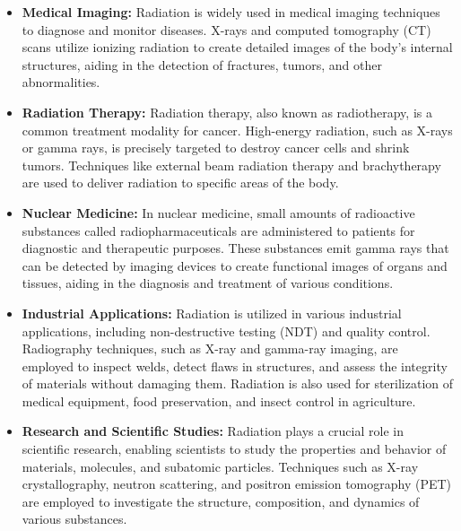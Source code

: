 \documentclass[../../Report.tex]{subfiles}
\begin{document}
        \begin{itemize}
            \item \textbf{Medical Imaging:} Radiation is widely used in medical imaging techniques to diagnose and monitor diseases. X-rays and 
            computed tomography (CT) scans utilize ionizing radiation to create detailed images of the body's internal structures, aiding in the 
            detection of fractures, tumors, and other abnormalities.

            \item \textbf{Radiation Therapy:} Radiation therapy, also known as radiotherapy, is a common treatment modality for cancer. 
            High-energy radiation, such as X-rays or gamma rays, is precisely targeted to destroy cancer cells and shrink tumors. Techniques like 
            external beam radiation therapy and brachytherapy are used to deliver radiation to specific areas of the body.

            \item \textbf{Nuclear Medicine:} In nuclear medicine, small amounts of radioactive substances called radiopharmaceuticals are 
            administered to patients for diagnostic and therapeutic purposes. These substances emit gamma rays that can be detected by imaging 
            devices to create functional images of organs and tissues, aiding in the diagnosis and treatment of various conditions.

            \item \textbf{Industrial Applications:} Radiation is utilized in various industrial applications, including non-destructive testing (NDT) 
            and quality control. Radiography techniques, such as X-ray and gamma-ray imaging, are employed to inspect welds, detect flaws in 
            structures, and assess the integrity of materials without damaging them. Radiation is also used for sterilization of medical equipment, 
            food preservation, and insect control in agriculture.

            \item \textbf{Research and Scientific Studies:} Radiation plays a crucial role in scientific research, enabling scientists to study 
            the properties and behavior of materials, molecules, and subatomic particles. Techniques such as X-ray crystallography, 
            neutron scattering, and positron emission tomography (PET) are employed to investigate the structure, composition, and dynamics of 
            various substances.


\end{itemize}
\end{document}

